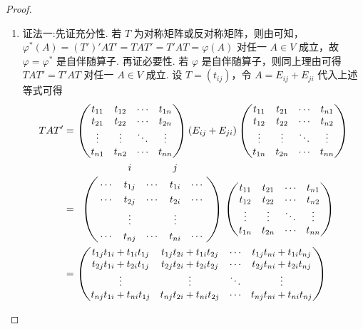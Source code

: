 \documentclass[../../main.tex]{subfiles}%
\begin{document}
\begin{proof}
\begin{enumerate}[(1)]
\item {\color{blue}证法一:}先证充分性. 若 \(T\) 为对称矩阵或反对称矩阵，则由可知，\(\varphi^*(A)=(T')'AT'=TAT'=T'AT=\varphi(A)\) 对任一 \(A\in V\) 成立，故 \(\varphi = \varphi^*\) 是自伴随算子.
再证必要性. 若 \(\varphi\) 是自伴随算子，则同上理由可得 \(TAT' = T'AT\) 对任一 \(A\in V\) 成立. 设 \(T=(t_{ij})\)，令 \(A = E_{ij}+E_{ji}\) 代入上述等式可得
\begin{align}
TAT' &= \begin{pmatrix}
t_{11} & t_{12} & \cdots & t_{1n} \\
t_{21} & t_{22} & \cdots & t_{2n} \\
\vdots & \vdots & \ddots & \vdots \\
t_{n1} & t_{n2} & \cdots & t_{nn} \\
\end{pmatrix}
(E_{ij}+E_{ji})
\begin{pmatrix}
t_{11} & t_{21} & \cdots & t_{n1} \\
t_{12} & t_{22} & \cdots & t_{n2} \\
\vdots & \vdots & \ddots & \vdots \\
t_{1n} & t_{2n} & \cdots & t_{nn} \\
\end{pmatrix}
\nonumber
\\
&= \bordermatrix{%
&    &    i&       &   j&  \cr
& \cdots & t_{1j} & \cdots & t_{1i} & \cdots \cr
&\cdots & t_{2j} & \cdots & t_{2i} & \cdots \cr
&  & \vdots&  &\vdots &\cr
&\cdots & t_{nj} & \cdots & t_{ni} & \cdots \cr
}
\begin{pmatrix}
t_{11} & t_{21} & \cdots & t_{n1} \\
t_{12} & t_{22} & \cdots & t_{n2} \\
\vdots & \vdots & \ddots & \vdots \\
t_{1n} & t_{2n} & \cdots & t_{nn} \\
\end{pmatrix}
\nonumber
\\
&= \begin{pmatrix}
t_{1j}t_{1i} + t_{1i}t_{1j} & t_{1j}t_{2i} + t_{1i}t_{2j} & \cdots & t_{1j}t_{ni} + t_{1i}t_{nj} \\
t_{2j}t_{1i} + t_{2i}t_{1j} & t_{2j}t_{2i} + t_{2i}t_{2j} & \cdots & t_{2j}t_{ni} + t_{2i}t_{nj} \\
\vdots & \vdots & \ddots & \vdots \\
t_{nj}t_{1i} + t_{ni}t_{1j} & t_{nj}t_{2i} + t_{ni}t_{2j} & \cdots & t_{nj}t_{ni} + t_{ni}t_{nj} \\

\end{pmatrix}
\end{align}
\end{enumerate}
\end{proof}
\end{document}
